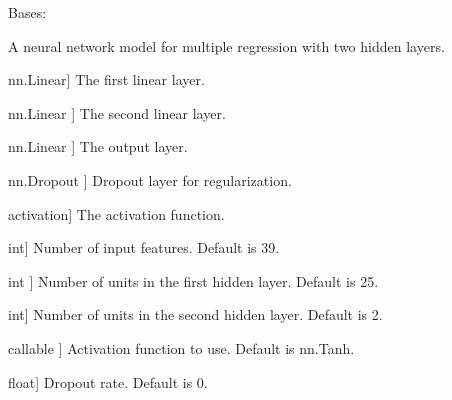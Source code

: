 \documentclass[letterpaper,10pt,english]{sphinxmanual}
\begin{document}
\begin{fulllineitems}
\label{\detokenize{architecture:architecture.MultipleRegression}}
\pysigstartsignatures
{}
\pysigstopsignatures
\sphinxAtStartPar
Bases: 

\sphinxAtStartPar
A neural network model for multiple regression with two hidden layers.
\begin{description}
\begin{description}
\sphinxlineitem{layer\_1}{[}nn.Linear{]}
\sphinxAtStartPar
The first linear layer.

\sphinxlineitem{layer\_2}{[}nn.Linear {]}
\sphinxAtStartPar
The second linear layer.

\sphinxlineitem{layer\_out}{[}nn.Linear {]}
\sphinxAtStartPar
The output layer.

\sphinxlineitem{dropout}{[}nn.Dropout {]}
\sphinxAtStartPar
Dropout layer for regularization.

\sphinxlineitem{act}{[}activation{]}
\sphinxAtStartPar
The activation function.

\end{description}

\begin{description}
\sphinxlineitem{num\_features}{[}int{]}
\sphinxAtStartPar
Number of input features. Default is 39.

\sphinxlineitem{num\_units\_1}{[}int {]}
\sphinxAtStartPar
Number of units in the first hidden layer. Default is 25.

\sphinxlineitem{num\_units\_2}{[}int{]}
\sphinxAtStartPar
Number of units in the second hidden layer. Default is 2.

\sphinxlineitem{activation}{[}callable {]}
\sphinxAtStartPar
Activation function to use. Default is nn.Tanh.

\sphinxlineitem{dropout\_rate}{[}float{]}
\sphinxAtStartPar
Dropout rate. Default is 0.


\end{description}
\end{description}
\end{fulllineitems}
\end{document}
